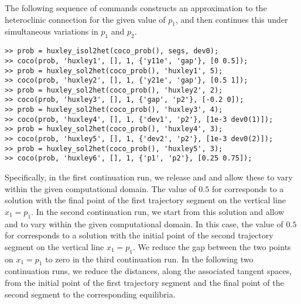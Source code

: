 The following sequence of commands constructs an approximation to the heteroclinic connection for the given value of $p_1$, and then continues this under simultaneous variations in $p_1$ and $p_2$.
\begin{lstlisting}[language=coco-highlight]
>> prob = huxley_isol2het(coco_prob(), segs, dev0);
>> coco(prob, 'huxley1', [], 1, {'y11e', 'gap'}, [0 0.5]);
>> prob = huxley_sol2het(coco_prob(), 'huxley1', 5);
>> coco(prob, 'huxley2', [], 1, {'y21e', 'gap'}, [0.5 1]);
>> prob = huxley_sol2het(coco_prob(), 'huxley2', 2);
>> coco(prob, 'huxley3', [], 1, {'gap', 'p2'}, [-0.2 0]);
>> prob = huxley_sol2het(coco_prob(), 'huxley3', 4);
>> coco(prob, 'huxley4', [], 1, {'dev1', 'p2'}, [1e-3 dev0(1)]);
>> prob = huxley_sol2het(coco_prob(), 'huxley4', 3);
>> coco(prob, 'huxley5', [], 1, {'dev2', 'p2'}, [1e-3 dev0(2)]);
>> prob = huxley_sol2het(coco_prob(), 'huxley5', 3);
>> coco(prob, 'huxley6', [], 1, {'p1', 'p2'}, [0.25 0.75]);
\end{lstlisting}
Specifically, in the first continuation run, we release  and  and allow these to vary within the given computational domain. The value of $0.5$ for  corresponds to a solution with the final point of the first trajectory segment on the vertical line $x_1=p_1$. In the second continuation run, we start from this solution and allow  and  to vary within the given computational domain. In this case, the value of $0.5$ for  corresponds to a solution with the initial point of the second trajectory segment on the vertical line $x_1=p_1$. We reduce the gap between the two points on $x_1=p_1$ to zero in the third continuation run. In the following two continuation runs, we reduce the distances, along the associated tangent spaces, from the initial point of the first trajectory segment and the final point of the second segment to the corresponding equilibria.\\
\medskip


